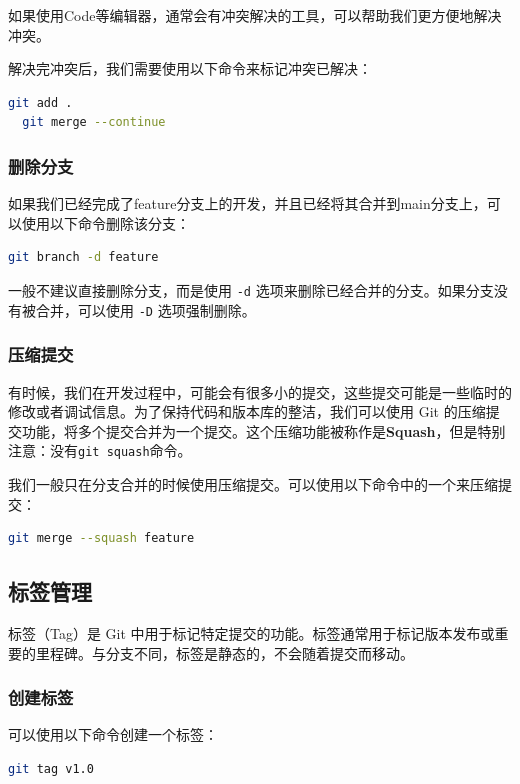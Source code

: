 \documentclass[../main.tex]{subfiles}
\begin{document}
如果使用Code等编辑器，通常会有冲突解决的工具，可以帮助我们更方便地解决冲突。

解决完冲突后，我们需要使用以下命令来标记冲突已解决：
\begin{lstlisting}[language=bash]
  git add .
  git merge --continue
\end{lstlisting}

\subsubsection{删除分支}

如果我们已经完成了feature分支上的开发，并且已经将其合并到main分支上，可以使用以下命令删除该分支：
\begin{lstlisting}[language=bash]
git branch -d feature
\end{lstlisting}

一般不建议直接删除分支，而是使用 \texttt{-d} 选项来删除已经合并的分支。如果分支没有被合并，可以使用 \texttt{-D} 选项强制删除。

\subsubsection{压缩提交}

有时候，我们在开发过程中，可能会有很多小的提交，这些提交可能是一些临时的修改或者调试信息。为了保持代码和版本库的整洁，我们可以使用 Git 的压缩提交功能，将多个提交合并为一个提交。这个压缩功能被称作是\textbf{Squash}，但是特别注意：没有\texttt{git squash}命令。

我们一般只在分支合并的时候使用压缩提交。可以使用以下命令中的一个来压缩提交：
\begin{lstlisting}[language=bash]
git merge --squash feature
\end{lstlisting}

\subsection{标签管理}
标签（Tag）是 Git 中用于标记特定提交的功能。标签通常用于标记版本发布或重要的里程碑。与分支不同，标签是静态的，不会随着提交而移动。

\subsubsection{创建标签}
可以使用以下命令创建一个标签：
\begin{lstlisting}[language=bash]
git tag v1.0
\end{lstlisting}
\end{document}
